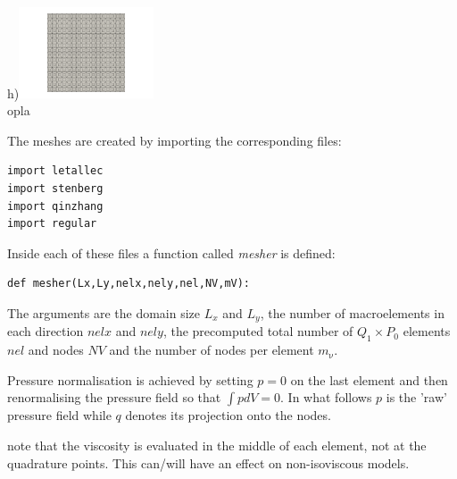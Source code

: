 \begin{center}
h)\includegraphics[width=4cm]{python_codes/fieldstone_78/results/mms_dh/16x16/grid0007}\\
{\captionfont  opla}
\end{center}

The meshes are created by importing the corresponding files:
\begin{lstlisting} 
import letallec
import stenberg
import qinzhang
import regular
\end{lstlisting} 
Inside each of these files a function called {\sl mesher} is defined: 
\begin{lstlisting} 
def mesher(Lx,Ly,nelx,nely,nel,NV,mV):
\end{lstlisting} 
The arguments are the domain size $L_x$ and $L_y$, the number of macroelements
in each direction $nelx$ and $nely$, the precomputed total number of $Q_1\times P_0$ 
elements $nel$ and nodes $NV$ and the number of nodes per element $m_\upnu$.  

Pressure normalisation is achieved by setting $p=0$ on the last element and then 
renormalising the pressure field so that $\int p dV=0$. In what follows $p$ is the 'raw' pressure
field while $q$ denotes its projection onto the nodes. 





{\color{red} note that the viscosity is evaluated in the middle of each element, not 
at the quadrature points. This can/will have an effect on non-isoviscous models.}


